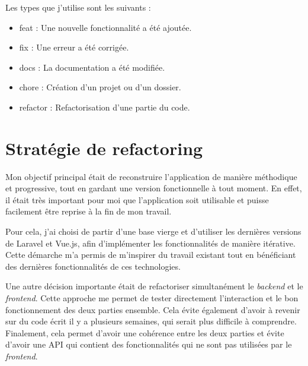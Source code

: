 Les types que j'utilise sont les suivants :
\begin{itemize}
    \item feat : Une nouvelle fonctionnalité a été ajoutée.
    \item fix : Une erreur a été corrigée.
    \item docs : La documentation a été modifiée.
    \item chore : Création d'un projet ou d'un dossier.
    \item refactor : Refactorisation d'une partie du code.
\end{itemize}

\section{Stratégie de refactoring}

Mon objectif principal était de reconstruire l'application de manière méthodique et progressive, tout en gardant une version fonctionnelle à tout moment. En effet, il était très important pour moi que l'application soit utilisable et puisse facilement être reprise à la fin de mon travail.

Pour cela, j'ai choisi de partir d'une base vierge et d'utiliser les dernières versions de Laravel et Vue.js, afin d'implémenter les fonctionnalités de manière itérative. Cette démarche m'a permis de m'inspirer du travail existant tout en bénéficiant des dernières fonctionnalités de ces technologies.

Une autre décision importante était de refactoriser simultanément le \emph{backend} et le \emph{frontend}. Cette approche me permet de tester directement l'interaction et le bon fonctionnement des deux parties ensemble. Cela évite également d'avoir à revenir sur du code écrit il y a plusieurs semaines, qui serait plus difficile à comprendre. Finalement, cela permet d'avoir une cohérence entre les deux parties et évite d'avoir une API qui contient des fonctionnalités qui ne sont pas utilisées par le \emph{frontend}.
